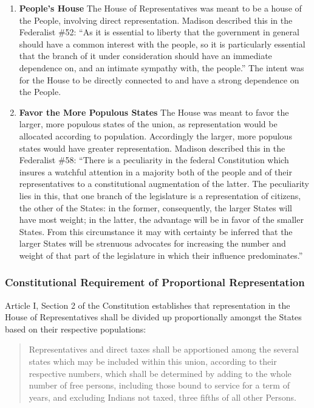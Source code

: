 \begin{enumerate}
\item \textbf{People's House} The House of Representatives was meant to be a house of the People, involving direct representation.  Madison described this in the Federalist \#52: ``As it is essential to liberty that the government in general should have a common interest with the people, so it is particularly essential that the branch of it under consideration should have an immediate dependence on, and an intimate sympathy with, the people.''  The intent was for the House to be directly connected to and have a strong dependence on the People.
\item \textbf{Favor the More Populous States} The House was meant to favor the larger, more populous states of the union, as representation would be allocated according to population.  Accordingly the larger, more populous states would have greater representation.  Madison described this in the Federalist \#58: ``There is a peculiarity in the federal Constitution which insures a watchful attention in a majority both of the people and of their representatives to a constitutional augmentation of the latter.  The peculiarity lies in this, that one branch of the legislature is a representation of citizens, the other of the States: in the former, consequently, the larger States will have most weight; in the latter, the advantage will be in favor of the smaller States.  From this circumstance it may with certainty be inferred that the larger States will be strenuous advocates for increasing the number and weight of that part of the legislature in which their influence predominates.''
\end{enumerate}

\subsubsection{Constitutional Requirement of Proportional Representation}

Article I, Section 2 of the Constitution establishes that representation in the House of Representatives shall be divided up proportionally amongst the States based on their respective populations:

\begin{quote}
Representatives and direct taxes shall be apportioned among the several states which may be included within this union, according to their respective numbers, which shall be determined by adding to the whole number of free persons, including those bound to service for a term of years, and excluding Indians not taxed, three fifths of all other Persons.
\end{quote}

